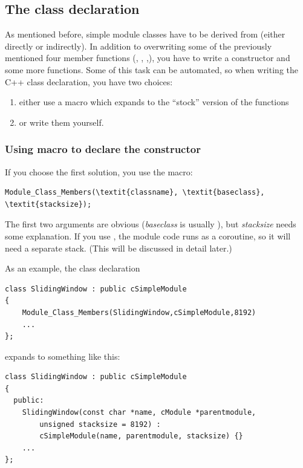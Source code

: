 \subsection{The class declaration}

As mentioned before, simple module classes have
to be derived from  (either directly or
indirectly). In addition to overwriting some of the previously
mentioned four member functions (,
, ,), you
have to write a constructor and some more
functions. Some of this task can be automated, so when writing the C++
class declaration, you have two choices:
\begin{enumerate}
\item{either use a macro which expands to the ``stock'' version of the
    functions}
\item{or write them yourself.}
\end{enumerate}

\subsubsection{Using macro to declare the constructor}

If you choose the first solution, you use the
 macro:

\begin{Verbatim}[commandchars=\\\{\}]
Module_Class_Members(\textit{classname}, \textit{baseclass}, \textit{stacksize});
\end{Verbatim}

The first two arguments are obvious (\textit{baseclass} is usually ),
but \textit{stacksize} needs some explanation. If you use ,
the module code runs as a coroutine, so it will need a separate
stack. (This will be discussed in detail later.)


As an example, the class declaration

\begin{verbatim}
class SlidingWindow : public cSimpleModule
{
    Module_Class_Members(SlidingWindow,cSimpleModule,8192)
    ...
};
\end{verbatim}

expands to something like this:

\begin{verbatim}
class SlidingWindow : public cSimpleModule
{
  public:
    SlidingWindow(const char *name, cModule *parentmodule,
        unsigned stacksize = 8192) :
        cSimpleModule(name, parentmodule, stacksize) {}
    ...
};
\end{verbatim}

